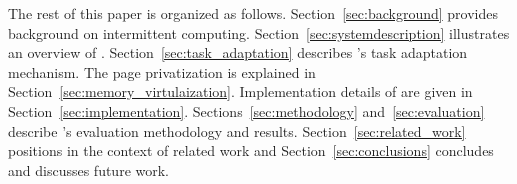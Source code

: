 The rest of this paper is organized as follows. Section~\ref{sec:background} provides background on intermittent computing.
Section~\ref{sec:systemdescription} illustrates an overview of \sys. Section~\ref{sec:task_adaptation} describes \sys's task adaptation mechanism. The page privatization is explained in Section~\ref{sec:memory_virtulaization}. Implementation details of \sys are given in Section~\ref{sec:implementation}. Sections~\ref{sec:methodology} and~\ref{sec:evaluation} describe \sys's evaluation methodology and results. Section~\ref{sec:related_work} positions \sys in the context of related work and Section~\ref{sec:conclusions} concludes and discusses future work.
